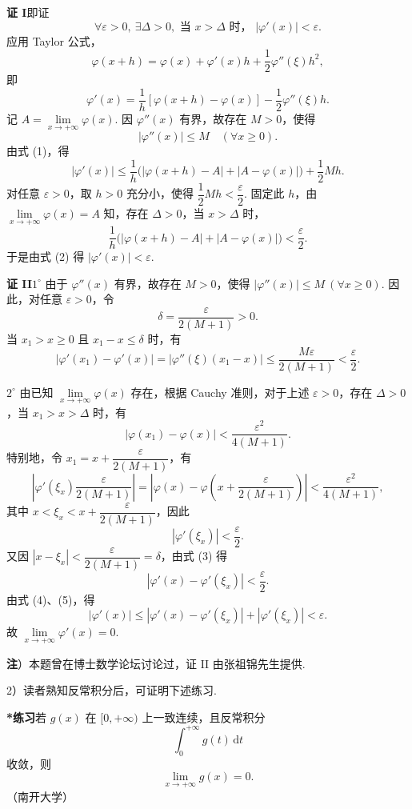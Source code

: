 \documentclass[UTF8, 12pt, fontset=fandol, oneside]{ctexart}
\begin{document}
\noindent\textbf{证 I}\quad 即证
\[
  \forall \varepsilon>0,\ \exists \Delta>0,\text{ 当 }x>\Delta\text{ 时， }|\varphi'(x)|<\varepsilon.
\]
应用 Taylor 公式，
\[
  \varphi(x+h)=\varphi(x)+\varphi'(x)h+\frac12\varphi''(\xi)h^2,
\]
即
\[
  \varphi'(x)=\frac1h[\varphi(x+h)-\varphi(x)]-\frac12\varphi''(\xi)h. \tag{1}
\]
记 $A=\lim\limits_{x\to+\infty}\varphi(x)$. 因 $\varphi''(x)$ 有界，故存在 $M>0$，使得
\[
  |\varphi''(x)|\le M\quad(\forall x\ge0).
\]
由式 (1)，得
\[
  |\varphi'(x)|\le\frac1h\bigl(|\varphi(x+h)-A|+|A-\varphi(x)|\bigr)+\frac12Mh. \tag{2}
\]
对任意 $\varepsilon>0$，取 $h>0$ 充分小，使得 $\dfrac12Mh<\dfrac{\varepsilon}{2}$. 固定此 $h$，由 $\lim\limits_{x\to+\infty}\varphi(x)=A$ 知，存在 $\Delta>0$，当 $x>\Delta$ 时，
\[
  \frac1h\bigl(|\varphi(x+h)-A|+|A-\varphi(x)|\bigr)<\frac{\varepsilon}{2}.
\]
于是由式 (2) 得 $|\varphi'(x)|<\varepsilon$.

\noindent\textbf{证 II}\quad $1^\circ$ 由于 $\varphi''(x)$ 有界，故存在 $M>0$，使得 $|\varphi''(x)|\le M\ (\forall x\ge0)$. 因此，对任意 $\varepsilon>0$，令
\[
  \delta=\frac{\varepsilon}{2(M+1)}>0.
\]
当 $x_1>x\ge0$ 且 $x_1-x\le\delta$ 时，有
\[
  |\varphi'(x_1)-\varphi'(x)|=|\varphi''(\xi)(x_1-x)|
  \le \frac{M\varepsilon}{2(M+1)}<\frac{\varepsilon}{2}. \tag{3}
\]

$2^\circ$ 由已知 $\lim\limits_{x\to+\infty}\varphi(x)$ 存在，根据 Cauchy 准则，对于上述 $\varepsilon>0$，存在 $\Delta>0$，当 $x_1>x>\Delta$ 时，有
\[
  |\varphi(x_1)-\varphi(x)|<\frac{\varepsilon^2}{4(M+1)}.
\]
特别地，令 $x_1=x+\dfrac{\varepsilon}{2(M+1)}$，有
\[
  \left|\varphi'(\xi_x)\frac{\varepsilon}{2(M+1)}\right|
  =\left|\varphi(x)-\varphi\left(x+\frac{\varepsilon}{2(M+1)}\right)\right|
  <\frac{\varepsilon^2}{4(M+1)},
\]
其中 $x<\xi_x<x+\dfrac{\varepsilon}{2(M+1)}$，因此
\[
  |\varphi'(\xi_x)|<\frac{\varepsilon}{2}. \tag{4}
\]
又因 $|x-\xi_x|<\dfrac{\varepsilon}{2(M+1)}=\delta$，由式 (3) 得
\[
  |\varphi'(x)-\varphi'(\xi_x)|<\frac{\varepsilon}{2}. \tag{5}
\]
由式 (4)、(5)，得
\[
  |\varphi'(x)|\le |\varphi'(x)-\varphi'(\xi_x)|+|\varphi'(\xi_x)|<\varepsilon.
\]
故 $\lim\limits_{x\to+\infty}\varphi'(x)=0$.

\noindent\textbf{注}）本题曾在博士数学论坛讨论过，证 II 由张祖锦先生提供.

2）读者熟知反常积分后，可证明下述练习.

\noindent\textbf{*练习}\quad 若 $g(x)$ 在 $[0,+\infty)$ 上一致连续，且反常积分
\[
  \int_0^{+\infty}g(t)\,\mathrm dt
\]
收敛，则
\[
  \lim_{x\to+\infty}g(x)=0.
\]
（南开大学）
\end{document}
